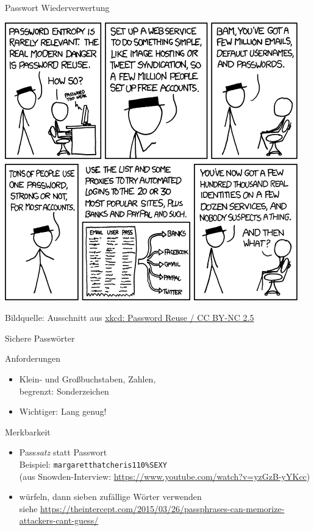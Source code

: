 \begin{frame}{Passwort Wiederverwertung}
  \begin{center}
    \includegraphics[height=0.8\textheight]{images/password_reuse_top.png}\\
  \end{center}
  \tiny Bildquelle: Ausschnitt aus \href{http://xkcd.com/792/}{xkcd: Password Reuse / CC BY-NC 2.5}
\end{frame}

\begin{frame}{Sichere Passwörter}
  \begin{block}{Anforderungen}
  \begin{itemize}
    \item Klein- und Großbuchstaben, Zahlen,\\ begrenzt: Sonderzeichen
    \item Wichtiger: Lang genug!
  \end{itemize}
  \end{block}
  \begin{block}{Merkbarkeit}
  \begin{itemize}
    \item Pass\textit{satz} statt Passwort\\
      Beispiel: \texttt{margaretthatcheris110\%SEXY}\\
      \scriptsize (aus Snowden-Interview: \url{https://www.youtube.com/watch?v=yzGzB-yYKcc})
      \normalsize
    \item würfeln, dann sieben zufällige Wörter verwenden\\
      \scriptsize siehe \url{https://theintercept.com/2015/03/26/passphrases-can-memorize-attackers-cant-guess/}
  \end{itemize}
  \end{block}
\end{frame}

